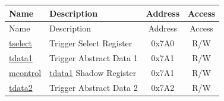 \begin{longtable}{ | p{4.0cm} | p{8.4cm} | c | c| }
\hline\rowcolor{lightgray}
Name & Description & Address & Access \\ \hline
\endfirsthead
\hline
\rowcolor{lightgray}
Name & Description & Address & Access  \\
\hline
\endhead
\endfoot

\hyperref[regdesc:LPTSELECT]{tselect} & Trigger Select Register & 0x7A0 & R/W \\\hline
\hyperref[regdesc:LPTDATA1]{tdata1} & Trigger Abstract Data 1 & 0x7A1 & R/W \\\hline
\hyperref[regdesc:LPMCONTROL]{mcontrol} & \hyperref[regdesc:LPTDATA1]{tdata1} Shadow Register & 0x7A1 & R/W \\\hline
\hyperref[regdesc:LPTDATA2]{tdata2} & Trigger Abstract Data 2 & 0x7A2 & R/W \\\hline
\end{longtable}

